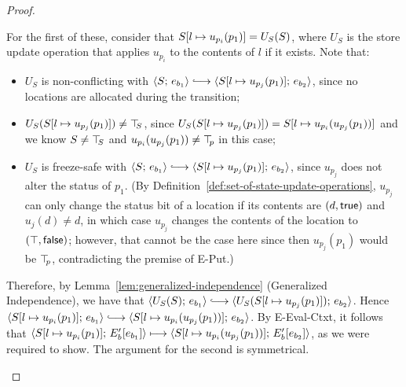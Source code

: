 \begin{proof}
\begin{enumerate}
\begin{enumerate}
\begin{itemize}
\begin{itemize}
            For the first of these, consider that
            $S[l \mapsto u_{p_i}(p_1)] = U_S(S)$, where $U_S$ is the
            store update operation that applies $u_{p_i}$ to the
            contents of $l$ if it exists.  Note that:
            \begin{itemize}
            \item $U_S$ is non-conflicting with $\config{S}{e_{b_1}}
              \parstepsto
              \config{\extSRaw{S}{l}{u_{p_j}(p_1)}}{e_{b_2}}$, since no
              locations are allocated during the transition;
            \item $U_S(S[l \mapsto u_{p_j}(p_1)]) \neq \top\hspace{-0.85mm}_{S}$, since
              $U_S(S[l \mapsto u_{p_j}(p_1)]) =
              S[l \mapsto u_{p_i}(u_{p_j}(p_1))]$ and we know $S \neq
              \top\hspace{-0.85mm}_{S}$ and $u_{p_i}(u_{p_j}(p_1)) \neq \top\hspace{-0.85mm}_{p}$ in this
              case;
            \item $U_S$ is freeze-safe with $\config{S}{e_{b_1}}
              \parstepsto
              \config{\extSRaw{S}{l}{u_{p_j}(p_1)}}{e_{b_2}}$, since
              $u_{p_j}$ does not alter the status of $p_1$.  (By
              Definition~\ref{def:set-of-state-update-operations},
              $u_{p_j}$ can only change the status bit of a location if
              its contents are $(d, \textsf{true})$ and $u_j(d) \neq
              d$, in which case $u_{p_j}$ changes the contents of the
              location to $(\top, \textsf{false})$; however, that
              cannot be the case here since then $u_{p_j}(p_1)$ would be
              $\top\hspace{-0.85mm}_{p}$, contradicting the premise of {\sc E-Put}.)
            \end{itemize}

            Therefore, by Lemma~\ref{lem:generalized-independence}
            (Generalized Independence), we have that
            $\config{U_S(S)}{e_{b_1}} \parstepsto
            \config{U_S(\extSRaw{S}{l}{u_{p_j}(p_1)})}{e_{b_2}}$.
            Hence $\config{\extSRaw{S}{l}{u_{p_i}(p_1)}}{e_{b_1}}
            \parstepsto
            \config{\extSRaw{S}{l}{u_{p_i}(u_{p_j}(p_1))}}{e_{b_2}}$.
            By {\sc E-Eval-Ctxt}, it follows that
            $\langle S[l \mapsto u_{p_i}(p_1)];\, E'_b\hspace{-0.5mm}\left[e_{b_1}\right] \rangle
            \longmapsto
            \langle S[l \mapsto u_{p_i}(u_{p_j}(p_1))];\, E'_b\hspace{-0.5mm}\left[e_{b_2}\right] \rangle$,
            as we were required to show.  The argument for the second
            is symmetrical.

          \end{itemize}


\end{itemize}
\end{enumerate}
\end{enumerate}
\end{proof}
